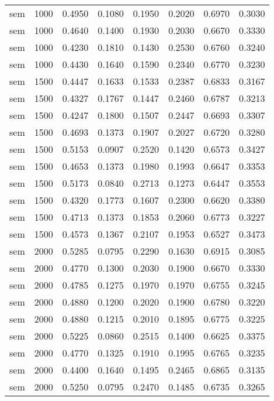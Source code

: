 \begin{scriptsize}
\begin{longtable}{cccccccc}
		sem      & 1000 & 0.4950 & 0.1080 & 0.1950 & 0.2020 & 0.6970 & 0.3030 \\
		sem      & 1000 & 0.4640 & 0.1400 & 0.1930 & 0.2030 & 0.6670 & 0.3330 \\
		sem      & 1000 & 0.4230 & 0.1810 & 0.1430 & 0.2530 & 0.6760 & 0.3240 \\
		sem      & 1000 & 0.4430 & 0.1640 & 0.1590 & 0.2340 & 0.6770 & 0.3230 \\
		sem      & 1500 & 0.4447 & 0.1633 & 0.1533 & 0.2387 & 0.6833 & 0.3167 \\
		sem      & 1500 & 0.4327 & 0.1767 & 0.1447 & 0.2460 & 0.6787 & 0.3213 \\
		sem      & 1500 & 0.4247 & 0.1800 & 0.1507 & 0.2447 & 0.6693 & 0.3307 \\
		sem      & 1500 & 0.4693 & 0.1373 & 0.1907 & 0.2027 & 0.6720 & 0.3280 \\
		sem      & 1500 & 0.5153 & 0.0907 & 0.2520 & 0.1420 & 0.6573 & 0.3427 \\
		sem      & 1500 & 0.4653 & 0.1373 & 0.1980 & 0.1993 & 0.6647 & 0.3353 \\
		sem      & 1500 & 0.5173 & 0.0840 & 0.2713 & 0.1273 & 0.6447 & 0.3553 \\
		sem      & 1500 & 0.4320 & 0.1773 & 0.1607 & 0.2300 & 0.6620 & 0.3380 \\
		sem      & 1500 & 0.4713 & 0.1373 & 0.1853 & 0.2060 & 0.6773 & 0.3227 \\
		sem      & 1500 & 0.4573 & 0.1367 & 0.2107 & 0.1953 & 0.6527 & 0.3473 \\
		sem      & 2000 & 0.5285 & 0.0795 & 0.2290 & 0.1630 & 0.6915 & 0.3085 \\
		sem      & 2000 & 0.4770 & 0.1300 & 0.2030 & 0.1900 & 0.6670 & 0.3330 \\
		sem      & 2000 & 0.4785 & 0.1275 & 0.1970 & 0.1970 & 0.6755 & 0.3245 \\
		sem      & 2000 & 0.4880 & 0.1200 & 0.2020 & 0.1900 & 0.6780 & 0.3220 \\
		sem      & 2000 & 0.4880 & 0.1215 & 0.2010 & 0.1895 & 0.6775 & 0.3225 \\
		sem      & 2000 & 0.5225 & 0.0860 & 0.2515 & 0.1400 & 0.6625 & 0.3375 \\
		sem      & 2000 & 0.4770 & 0.1325 & 0.1910 & 0.1995 & 0.6765 & 0.3235 \\
		sem      & 2000 & 0.4400 & 0.1640 & 0.1495 & 0.2465 & 0.6865 & 0.3135 \\
		sem      & 2000 & 0.5250 & 0.0795 & 0.2470 & 0.1485 & 0.6735 & 0.3265 \\

\end{longtable}
\end{scriptsize}
